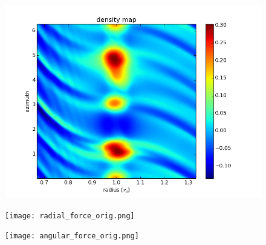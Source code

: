\documentclass{beamer}
\begin{document}
\begin{frame}
 \begin{figure}[H]
  \centering
  \includegraphics[width=1\textwidth]{density.png}
\end{figure}
\end{frame}
\begin{frame}
 \begin{figure}[H]
  \centering
  \texttt{[image: radial\_force\_orig.png]}
\end{figure}
\end{frame}
\begin{frame}
 \begin{figure}[H]
  \centering
  \texttt{[image: angular\_force\_orig.png]}
\end{figure}
\end{frame}
\end{document}
